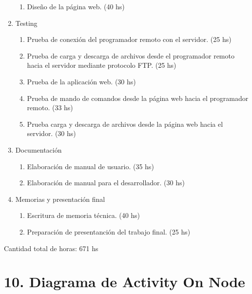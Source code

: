 \documentclass[
11pt, %
]{charter}
\begin{document}
\begin{enumerate}
\begin{enumerate}
	\item Diseño de la página web. (40 hs)
	\end{enumerate}
\item Testing
	\begin{enumerate}
	\item Prueba de conexión del programador remoto con el servidor. (25 hs)
	\item Prueba de carga y descarga de archivos desde el programador remoto hacia el servidor mediante protocolo FTP. (25 hs)
	\item Prueba de la aplicación web. (30 hs)
	\item Prueba de mando de comandos desde la página web hacia el programador remoto. (33 hs)
	\item Prueba carga y descarga de archivos desde la página web hacia el servidor. (30 hs)
	\end{enumerate}
\item Documentación
	\begin{enumerate}
	\item Elaboración de manual de usuario. (35 hs)
	\item Elaboración de manual para el desarrollador. (30 hs)
	\end{enumerate}
\item Memorias y presentación final
	\begin{enumerate}
	\item Escritura de memoria técnica. (40 hs)
	\item Preparación de presentanción del trabajo final. (25 hs)
	\end{enumerate}
\end{enumerate}

Cantidad total de horas: 671 hs

\newpage
\section{10. Diagrama de Activity On Node}
\label{sec:AoN}


\end{document}
